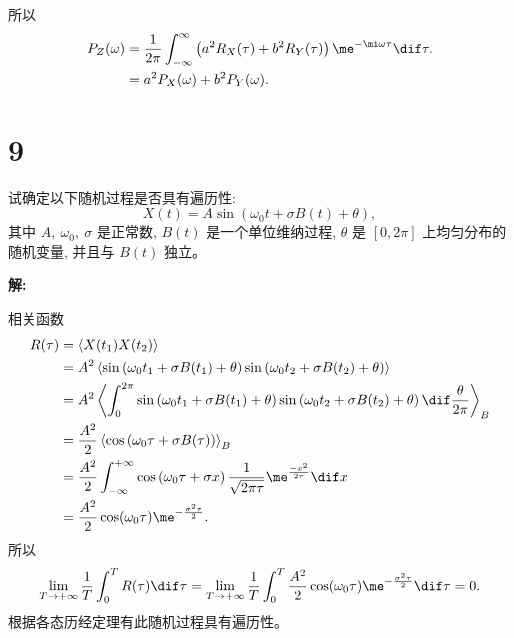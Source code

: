 \documentclass[12pt,a4]{ctexart}
\begin{document}
所以
\begin{equation}
	\begin{aligned}
		P_Z(\omega) & =\frac{1}{2\pi} \int^{\infty}_{-\infty} \left(a^2 R_X(\tau) + b^2 R_Y(\tau)\right) \me^{-\mi \omega \tau} \dif \tau. \\
		            & = a^2 P_X(\omega) + b^2 P_Y(\omega).
	\end{aligned}
\end{equation}



\section{9}


试确定以下随机过程是否具有遍历性:
\begin{equation}
	X(t)=A \sin \left(\omega_{0} t+\sigma B(t)+\theta \right),
\end{equation}
其中 $A,\ \omega_{0},\ \sigma$ 是正常数, $B(t)$ 是一个单位维纳过程, $\theta$ 是 $[0,2 \pi]$ 上均匀分布的随机变量, 并且与 $B(t)$ 独立。

\textsf{\hspace{-2em}\sf  \textbf{解:}}

相关函数
\begin{equation}
	\begin{aligned}
		R(\tau) & = \left\langle X(t_1) X(t_2) \right\rangle                                                                                                                                                  \\
		        & = A^2 \left\langle \sin \left(\omega_{0} t_1 + \sigma B(t_1)+\theta \right) \sin \left(\omega_{0} t_2 + \sigma B(t_2)+\theta \right) \right\rangle                                          \\
		        & = A^2 \left\langle \int_0^{2\pi} \sin \left(\omega_{0} t_1 + \sigma B(t_1)+\theta \right) \sin \left(\omega_{0} t_2 + \sigma B(t_2)+\theta \right) \dif \frac{\theta}{2\pi} \right\rangle_B \\
		        & = \frac{A^2}{2}\left\langle  \cos \left(\omega_{0} \tau + \sigma B(\tau) \right) \right\rangle_B                                                                                            \\
		        & = \frac{A^2}{2}\int^{+\infty}_{-\infty}  \cos \left(\omega_{0} \tau + \sigma x \right) \frac{1}{\sqrt{2\pi \tau}} \me^{\frac{-x^2}{2\tau}} \dif x                                           \\
		        & = \frac{A^2}{2}\cos(\omega_0 \tau) \me^{-\frac{\sigma^2\tau}{2}}.
	\end{aligned}
\end{equation}
所以
\begin{equation}
	\lim_{T \to +\infty} \frac{1}{T} \int^T_0 R(\tau) \dif \tau = \lim_{T \to +\infty} \frac{1}{T} \int^T_0 \frac{A^2}{2}\cos(\omega_0 \tau) \me^{-\frac{\sigma^2\tau}{2}} \dif \tau = 0.
\end{equation}
根据各态历经定理有此随机过程具有遍历性。
\end{document}
